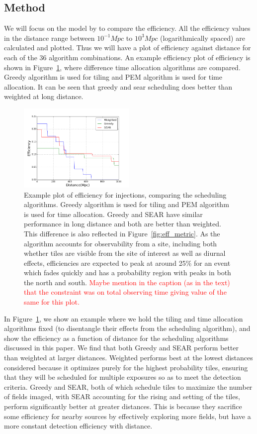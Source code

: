 \documentclass[twocolumn]{aastex62}
\begin{document}
\subsection{Method}
We will focus on the model by \cite{Me2017} to compare the efficiency. All the efficiency values in the distance range between $10^{-1} Mpc$ to $10^3 Mpc$ (logarithmically spaced) are calculated and plotted. Thus we will have a plot of efficiency against distance for each of the 36 algorithm combinations. An example efficiency plot of efficiency is shown in Figure~\ref{fig:eff_ex}, where difference time allocation algorithms are compared. Greedy algorithm is used for tiling and PEM algorithm is used for time allocation. It can be seen that greedy and sear scheduling does better than weighted at long distance. 

\begin{figure}[t]
\centering
\includegraphics[width=0.5\textwidth]{plots/eff_ex.png}
\caption{Example plot of efficiency for \cite{Me2017} injections, comparing the scheduling algorithms. Greedy algorithm is used for tiling and PEM algorithm is used for time allocation. Greedy and SEAR have similar performance in long distance and both are better than weighted. This difference is also reflected in Figure~\ref{fig:eff_metric}. As the algorithm accounts for observability from a site, including both whether tiles are visible from the site of interest as well as diurnal effects, efficiencies are expected to peak at around 25\% for an event which fades quickly and has a probability region with peaks in both the north and south.
	\textcolor{red}{Maybe mention in the caption (as in the text) that the constraint was 
	on total observing time giving value of the same for this plot.}
}
\label{fig:eff_ex}
\end{figure}
In Figure~\ref{fig:eff_ex}, we show an example where we hold the tiling and time allocation algorithms fixed (to disentangle their effects from the scheduling algorithm), and show the efficiency as a function of distance for the scheduling algorithms discussed in this paper. We find that both Greedy and SEAR perform better than weighted at larger distances. Weighted performs best at the lowest distances considered because it optimizes purely for the highest probability tiles, ensuring that they will be scheduled for multiple exposures so as to meet the detection criteria. Greedy and SEAR, both of which schedule tiles to maximize the number of fields imaged, with SEAR accounting for the rising and setting of the tiles, perform significantly better at greater distances. This is because they sacrifice some efficiency for nearby sources by effectively exploring more fields, but have a more constant detection efficiency with distance.
\end{document}
